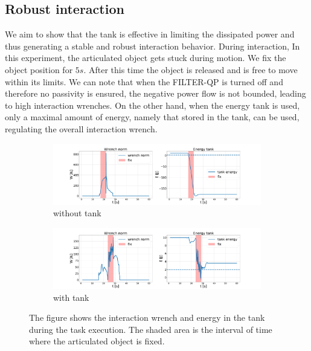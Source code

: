 \subsection{Robust interaction}
We aim to show that the tank is effective in limiting the dissipated power and thus generating a stable and robust interaction behavior. During interaction, In this experiment, the articulated object gets stuck during motion. We fix the object position for $5s$. After this time the object is released and is free to move within its limits. We can note that when the FILTER-QP is turned off and therefore no passivity is ensured, the negative power flow is not bounded, leading to high interaction wrenches. On the other hand, when the energy tank is used, only a maximal amount of energy, namely that stored in the tank, can be used, regulating the overall interaction wrench.    

\begin{figure}[t]
\centering
\hspace*{-0.0cm} 
\begin{subfigure}{1.0\columnwidth}
    \includegraphics[width=\linewidth]{figures/fix_experiment/wrench_tank_without_tank.pdf}
    \caption{without tank}
\end{subfigure}
\hspace*{-0.0cm} 
\begin{subfigure}{1.0\columnwidth}
    \includegraphics[width=\linewidth]{figures/fix_experiment/wrench_tank_with_tank.pdf}
    \caption{with tank}
\end{subfigure}
\hfill
\caption{The figure shows the interaction wrench and energy in the tank during the task execution. The shaded area is the interval of time where the articulated object is fixed.  }\label{fig:methods_comparison}
\end{figure}


